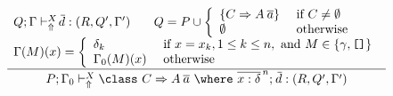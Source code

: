 \begin{figure}
\[ \begin{array}{cc}
	\displaystyle\frac
	 {\begin{array}{ll}
            Q;\Gamma \vdash_{\Uparrow}^X \overline{\!d} : (R, Q', \Gamma') \:\: & \:\:
            Q = P \cup \left\{ \begin{array}{ll}
                                  \{ C \Rightarrow A\:\overline{a} \} & \text{ if } C \not= \emptyset \\
                                  \emptyset                              & \text{ otherwise}
                                \end{array}\right. \\
            \multicolumn{2}{c}{
                \Gamma(M)(x) = \left\{ \begin{array}{ll}
                                 \delta_k       & \text{ if } x = x_k, 1 \leq k \leq n, \text{ and } 
                                                              M \in \{ \gamma, \texttt{[]} \}\\
                                 \Gamma_0(M)(x) & \text{ otherwise} 
                               \end{array}\right. }
          \end{array}}
	 {P;\Gamma_0 \vdash_{\Uparrow}^X \class\ C \Rightarrow A\: \overline{a}\ \where\ \overline{x:\delta}^{\,n};\: \overline{\!d} : 
            (R, Q', \Gamma') } \\ \\


\end{array}\]
\end{figure}
